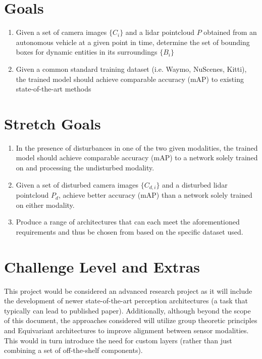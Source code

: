 \documentclass{article}
\begin{document}
\section{Goals}
\begin{enumerate}
    \item Given a set of camera images $\{C_i\}$ and a lidar pointcloud $P$ obtained from an autonomous vehicle at a 
    given point in time, determine the set of bounding boxes for dynamic entities in its surroundings $\{B_i\}$ 
    \item Given a common standard training dataset (i.e. Waymo, NuScenes, Kitti), the trained model should achieve comparable 
    accuracy (mAP) to existing state-of-the-art methods
    
\end{enumerate}
\section{Stretch Goals}
\begin{enumerate}
    \item In the presence of disturbances in one of the two given modalities, the trained model should achieve comparable 
    accuracy (mAP) to a network solely trained on and processing the undisturbed modality.
    \item Given a set of disturbed camera images $\{C_{d,i}\}$ and a disturbed lidar pointcloud $P_d$, achieve 
    better accuracy (mAP) than a network solely trained on either modality.
    \item Produce a range of architectures that can each meet the aforementioned requirements and thus be chosen from based
    on the specific dataset used. 
\end{enumerate}
\section{Challenge Level and Extras}

This project would be considered an advanced research project as it will include the development
of newer state-of-the-art perception architectures (a task that typically can lead to published paper).
Additionally, although beyond the scope of this document, the approaches considered will utilize group
theoretic principles and Equivariant architectures to improve alignment between sensor modalities. This 
would in turn introduce the need for custom layers (rather than just combining a set of off-the-shelf components).

\newpage{}
\end{document}
